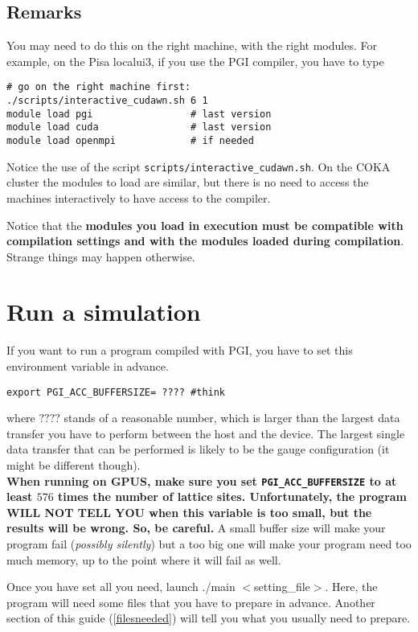 \subsection{Remarks} 
You may need to do this on the right machine, with the right modules.
For example, on the Pisa localui3, if you use the PGI compiler,
you have to type
\begin{verbatim}
# go on the right machine first:
./scripts/interactive_cudawn.sh 6 1
module load pgi                 # last version
module load cuda                # last version
module load openmpi             # if needed 
\end{verbatim}
Notice the use of the script \verb|scripts/interactive_cudawn.sh|.
On the COKA cluster the modules to load are similar, but there is no need to access
the machines interactively to have access to the compiler.

Notice that the { \bf modules you load in execution must be compatible 
with compilation settings and with the modules loaded during compilation}.
Strange things may happen otherwise.

\section{Run a simulation}

If you want to run a program compiled with PGI, you have to set this 
environment variable in advance.
\begin{verbatim}
export PGI_ACC_BUFFERSIZE= ???? #think
\end{verbatim}
where $????$ stands of a reasonable number, which is larger than the largest 
data transfer you have to perform between the host and the device. The largest 
single data transfer that can be performed is likely to be the gauge 
configuration (it might be different though). \\
{ \bf When running on GPUS, make sure you set \verb|PGI_ACC_BUFFERSIZE| to at 
    least $576$ times the number of lattice sites. Unfortunately, the program WILL 
    NOT TELL YOU when this variable is too small, but the results will be wrong. 
So, be careful.}
A small buffer size will make your program fail (\emph{possibly silently}) 
but a too big one will make your program need too much memory, up to the point 
where it will fail as well.


Once you have set all you need, launch 
{\sf ./main $<$setting\_file$>$}. Here, the program 
will  need some  files that you have to prepare in advance. Another section
of this guide (\ref{filesneeded}) will tell you what you usually need to 
prepare.


